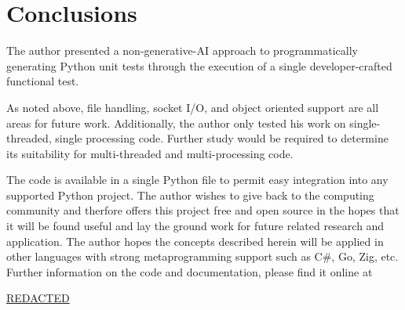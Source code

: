 \section{Conclusions}\label{sec:conclusions}

The author presented a non-generative-AI approach to 
programmatically generating Python unit tests through
the execution of a single developer-crafted functional test.

As noted above, file handling, socket I/O, 
and object oriented support are all areas for future work.  
Additionally, the author only tested his work on single-threaded,
single processing code.  Further study would be required to 
determine its suitability for multi-threaded and multi-processing code.

The code is available in a single Python file to permit 
easy integration into any supported Python project.
The author wishes to give back to the computing community
and therfore offers this project free and open source
in the hopes that it will be found useful and lay the ground
work for future related research and application.
The author hopes the concepts described herein will be 
applied in other languages with strong metaprogramming support
such as C\#, Go, Zig, etc.  Further information on the code and  documentation, please
find it online at
%
\begin{center}
  \url{REDACTED}
\end{center}


